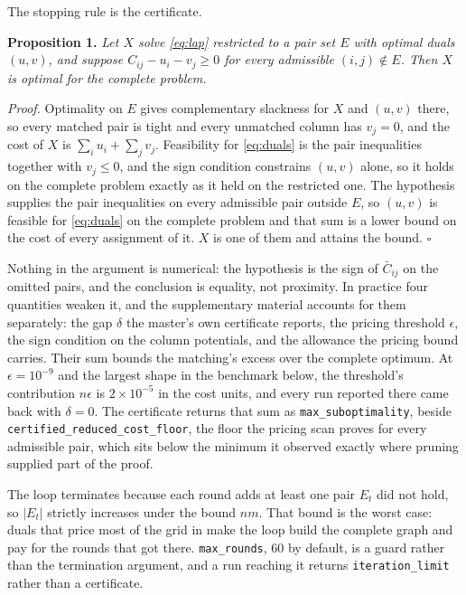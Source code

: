 The stopping rule is the certificate.

\textbf{Proposition 1.} \emph{Let \(X\) solve \eqref{eq:lap} restricted to a pair set \(E\)
with optimal duals \((u, v)\), and suppose \(C_{ij} - u_i - v_j \ge 0\) for every
admissible \((i,j) \notin E\). Then \(X\) is optimal for the complete problem.}

\emph{Proof.} Optimality on \(E\) gives complementary slackness for \(X\) and \((u,v)\)
there, so every matched pair is tight and every unmatched column has \(v_j = 0\),
and the cost of \(X\) is \(\sum_i u_i + \sum_j v_j\). Feasibility for
\eqref{eq:duals} is the pair inequalities together with \(v_j \le 0\), and the
sign condition constrains \((u, v)\) alone, so it holds on the complete problem
exactly as it held on the restricted one. The hypothesis supplies the pair
inequalities on every admissible pair outside \(E\), so \((u, v)\) is feasible for
\eqref{eq:duals} on the complete problem and that sum is a lower bound on the
cost of every assignment of it. \(X\) is one of them and attains the bound.
\(\square\)

Nothing in the argument is numerical: the hypothesis is the sign of
\(\bar{C}_{ij}\) on the omitted pairs, and the conclusion is equality, not
proximity. In practice four quantities weaken it, and the supplementary
material accounts for them separately: the gap \(\delta\) the master's own
certificate reports, the pricing threshold \(\epsilon\), the sign condition on
the column potentials, and the allowance the pricing bound carries. Their sum
bounds the matching's excess over the complete optimum. At
\(\epsilon = 10^{-9}\) and the largest shape in the benchmark below, the
threshold's contribution \(n\epsilon\) is \(2 \times 10^{-5}\) in the cost
units, and every run reported there came back with \(\delta = 0\). The
certificate returns that sum as \texttt{max\_suboptimality}, beside
\texttt{certified\_reduced\_cost\_floor}, the floor the pricing scan proves for every
admissible pair, which sits below the minimum it observed exactly where pruning
supplied part of the proof.

The loop terminates because each round adds at least one pair \(E_t\) did not
hold, so \(|E_t|\) strictly increases under the bound \(nm\). That bound is the
worst case: duals that price most of the grid in make the loop build the
complete graph and pay for the rounds that got there. \texttt{max\_rounds}, 60 by
default, is a guard rather than the termination argument, and a run reaching it
returns \texttt{iteration\_limit} rather than a certificate.

